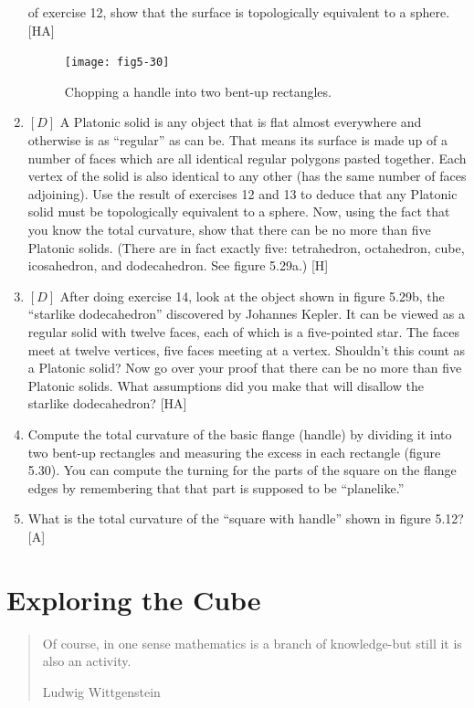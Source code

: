 \documentclass{book}
\begin{document}
\begin{enumerate}
of exercise 12, show that the surface is topologically equivalent to a
sphere. [HA]
\begin{figure}
\begin{center}
\texttt{[image: fig5-30]}
\caption{Chopping a handle into two bent-up rectangles.}
\end{center}
\end{figure}
\item $[D]$ A Platonic solid is any object that is flat almost everywhere
and otherwise is as ``regular'' as can be. That means its surface is made
up of a number of faces which are all identical regular polygons pasted
together. Each vertex of the solid is also identical to any other (has
the same number of faces adjoining). Use the result of exercises 12 and
13 to deduce that any Platonic solid must be topologically equivalent
to a sphere. Now, using the fact that you know the total curvature,
show that there can be no more than five Platonic solids. (There are
in fact exactly five: tetrahedron, octahedron, cube, icosahedron, and
dodecahedron. See figure 5.29a.) [H]
\item $[D]$ After doing exercise 14, look at the object shown in figure 5.29b,
the ``starlike dodecahedron'' discovered by Johannes Kepler. It can be
viewed as a regular solid with twelve faces, each of which is a five-pointed
star. The faces meet at twelve vertices, five faces meeting at a vertex.
Shouldn't this count as a Platonic solid? Now go over your proof that
there can be no more than five Platonic solids. What assumptions did
you make that will disallow the starlike dodecahedron? [HA]
\item Compute the total curvature of the basic flange (handle) by dividing
it into two bent-up rectangles and measuring the excess in each rectangle
(figure 5.30). You can compute the turning for the parts of the square
on the flange edges by remembering that that part is supposed to be
``planelike.''
\item What is the total curvature of the ``square with handle'' shown in
figure 5.12? [A]
\end{enumerate}

\chapter{Exploring the Cube}
\begin{quote}
Of course, in one sense mathematics is a branch of
knowledge-but still it is also an activity.

Ludwig Wittgenstein
\end{quote}
\end{document}
